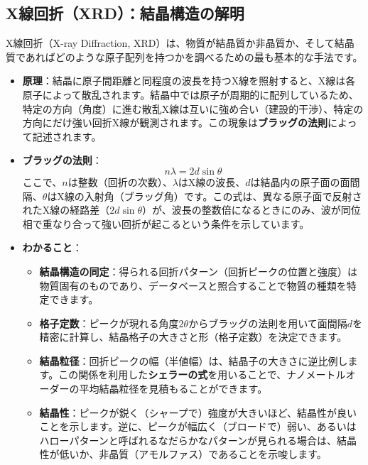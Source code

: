 \documentclass[11pt,a4paper]{ltjsarticle}
\begin{document}
\subsection{X線回折（XRD）：結晶構造の解明}
X線回折（X-ray Diffraction, XRD）は、物質が結晶質か非晶質か、そして結晶質であればどのような原子配列を持つかを調べるための最も基本的な手法です。
\begin{itemize}
    \item \textbf{原理}：結晶に原子間距離と同程度の波長を持つX線を照射すると、X線は各原子によって散乱されます。結晶中では原子が周期的に配列しているため、特定の方向（角度）に進む散乱X線は互いに強め合い（建設的干渉）、特定の方向にだけ強い回折X線が観測されます。この現象は\textbf{ブラッグの法則}によって記述されます\cite{ref1}。
    \item \textbf{ブラッグの法則}：
    \[ n\lambda = 2d\sin\theta \]
    ここで、$n$は整数（回折の次数）、$\lambda$はX線の波長、$d$は結晶内の原子面の面間隔、$\theta$はX線の入射角（ブラッグ角）です。この式は、異なる原子面で反射されたX線の経路差（$2d\sin\theta$）が、波長の整数倍になるときにのみ、波が同位相で重なり合って強い回折が起こるという条件を示しています\cite{ref1}。
    \item \textbf{わかること}：
    \begin{itemize}
        \item \textbf{結晶構造の同定}：得られる回折パターン（回折ピークの位置と強度）は物質固有のものであり、データベースと照合することで物質の種類を特定できます。
        \item \textbf{格子定数}：ピークが現れる角度$2\theta$からブラッグの法則を用いて面間隔$d$を精密に計算し、結晶格子の大きさと形（格子定数）を決定できます\cite{ref1}。
        \item \textbf{結晶粒径}：回折ピークの幅（半値幅）は、結晶子の大きさに逆比例します。この関係を利用した\textbf{シェラーの式}を用いることで、ナノメートルオーダーの平均結晶粒径を見積もることができます\cite{ref1}。
        \item \textbf{結晶性}：ピークが鋭く（シャープで）強度が大きいほど、結晶性が良いことを示します。逆に、ピークが幅広く（ブロードで）弱い、あるいはハローパターンと呼ばれるなだらかなパターンが見られる場合は、結晶性が低いか、非晶質（アモルファス）であることを示唆します\cite{ref1}。
    \end{itemize}
\end{itemize}
\end{document}
